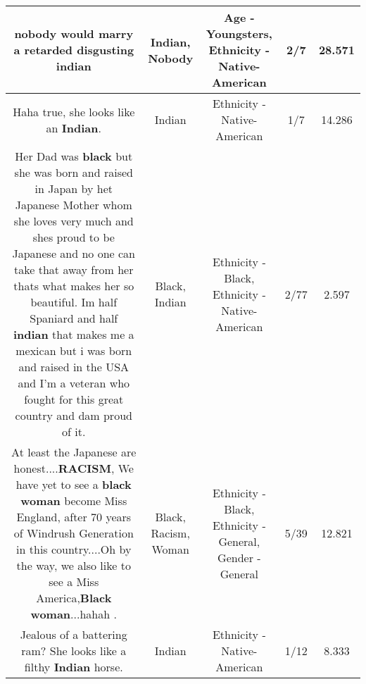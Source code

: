 \documentclass[11pt]{article}
\newlength\mylength
\begin{document}
\begin{center}
\begin{longtable}{|C{.65\mylength}|C{.30\mylength}|C{.12\mylength}|C{.12\mylength}|C{.12\mylength}|}
  \small nobody would marry a retarded disgusting indian\normalsize   & Indian, Nobody & Age - Youngsters, Ethnicity - Native-American & 2/7 & 28.571 \\  \hline
  \small Haha true, she looks like an \textbf{Indian}.\normalsize   & Indian & Ethnicity - Native-American & 1/7 & 14.286 \\  \hline
  \small Her Dad was \textbf{black} but she was born and raised in Japan by het Japanese Mother whom she loves very much and shes proud to be Japanese and no one can take that away from her thats what makes her so beautiful. Im half Spaniard and half \textbf{indian} that makes me a mexican but i was born and raised in the USA and I'm a veteran who fought for this great country and dam proud of it.\normalsize   & Black, Indian & Ethnicity - Black, Ethnicity - Native-American & 2/77 & 2.597 \\  \hline
  \small At least the Japanese are honest....\textbf{RACISM}, We have yet to see a \textbf{black} \textbf{woman} become Miss England, after 70 years of Windrush Generation in this country....Oh by the way, we also like to see a Miss  America,\textbf{Black} \textbf{woman}...hahah .\normalsize   & Black, Racism, Woman & Ethnicity - Black, Ethnicity - General, Gender - General & 5/39 & 12.821 \\  \hline
  \small Jealous of a battering ram? She looks like a filthy \textbf{Indian} horse.\normalsize   & Indian & Ethnicity - Native-American & 1/12 & 8.333 \\  \hline

\end{longtable}
\end{center}
\end{document}
